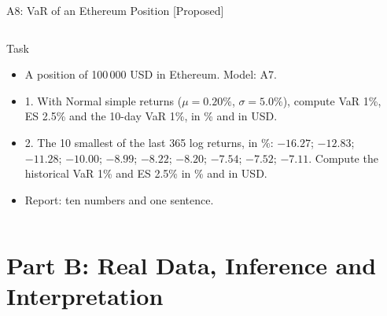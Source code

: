 \begin{frame}{A8: VaR of an Ethereum Position [Proposed]}
\propsub
\itemsize{\scriptsize}
\begin{columns}[T]
\begin{column}{\taskw}
\begin{block}{Task}
\begin{itemize}
    \item A position of 100\,000 USD in Ethereum. Model: A7.
    \item 1. With Normal simple returns ($\mu = 0.20\%$, $\sigma = 5.0\%$), compute VaR 1\%, ES 2.5\% and the 10-day VaR 1\%, in \% and in USD.
    \item 2. The 10 smallest of the last 365 log returns, in \%: $-16.27$; $-12.83$; $-11.28$; $-10.00$; $-8.99$; $-8.22$; $-8.20$; $-7.54$; $-7.52$; $-7.11$. Compute the historical VaR 1\% and ES 2.5\% in \% and in USD.
    \item Report: ten numbers and one sentence.
\end{itemize}
\end{block}
\end{column}
\begin{column}{\solw}
\end{column}
\end{columns}
\end{frame}


\section{Part B: Real Data, Inference and Interpretation}

